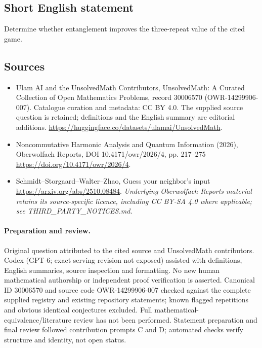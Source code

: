 \documentclass[11pt]{article}
\begin{document}
\subsection{Short English statement}
Determine whether entanglement improves the three-repeat value of the cited game.
\subsection{Sources}
\begin{itemize}
\item[\hypertarget{source:30006570:1}{S1}] Ulam AI and the UnsolvedMath Contributors, UnsolvedMath: A Curated Collection of Open Mathematics Problems, record 30006570 (OWR-14299906-007). Catalogue curation and metadata: CC BY 4.0. The supplied source question is retained; definitions and the English summary are editorial additions.
\url{https://huggingface.co/datasets/ulamai/UnsolvedMath}.
\item[\hypertarget{source:30006570:2}{S2}] Noncommutative Harmonic Analysis and Quantum Information (2026), Oberwolfach Reports, DOI 10.4171/owr/2026/4, pp. 217--275
\url{https://doi.org/10.4171/owr/2026/4}.
\item[\hypertarget{source:30006570:3}{S3}] Schmidt--Storgaard--Walter--Zhao, Guess your neighbor's input
\url{https://arxiv.org/abs/2510.08484}.
\textit{Underlying Oberwolfach Reports material retains its source-specific licence, including CC BY-SA 4.0 where applicable; see THIRD\_PARTY\_NOTICES.md.}
\end{itemize}
\paragraph{Preparation and review.}
Original question attributed to the cited source and UnsolvedMath contributors. Codex (GPT-6; exact serving revision not exposed) assisted with definitions, English summaries, source inspection and formatting. No new human mathematical authorship or independent proof verification is asserted. Canonical ID 30006570 and source code OWR-14299906-007 checked against the complete supplied registry and existing repository statements; known flagged repetitions and obvious identical conjectures excluded. Full mathematical-equivalence/literature review has not been performed. Statement preparation and final review followed contribution prompts C and D; automated checks verify structure and identity, not open status.
\label{end:30006570}
\end{document}
